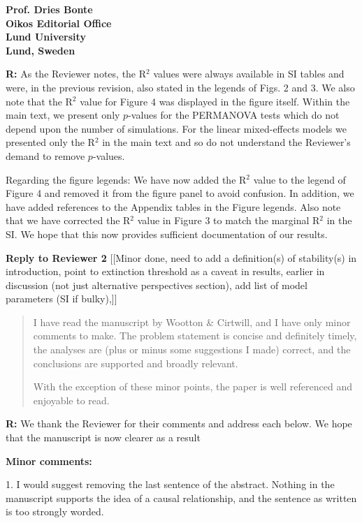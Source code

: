 \documentclass[12pt]{letter}
\begin{document}
\begin{letter}{\bf Prof. Dries Bonte\\
Oikos Editorial Office \\
Lund University \\
Lund, Sweden}
      \smallskip

      \textbf{R:} As the Reviewer notes, the R$^2$ values were always available in SI tables and were, in the previous revision, also stated in the legends of Figs. 2 and 3. We also note that the R$^2$ value for Figure 4 was displayed in the figure itself. Within the main text, we present only $p$-values for the PERMANOVA tests which do not depend upon the number of simulations. For the linear mixed-effects models we presented only the R$^2$ in the main text and so do not understand the Reviewer's demand to remove $p$-values.


      Regarding the figure legends: We have now added the R$^2$ value to the legend of Figure 4 and removed it from the figure panel to avoid confusion. In addition, we have added references to the Appendix tables in the Figure legends. Also note that we have corrected the R$^2$ value in Figure 3 to match the marginal R$^2$ in the SI. We hope that this now provides sufficient documentation of our results.



\clearpage

{\large\textbf{Reply to Reviewer 2}} [[Minor done, need to add a definition(s) of stability(s) in introduction, point to extinction threshold as a caveat in results, earlier in discussion (not just alternative perspectives section), add list of model parameters (SI if bulky),]]

  \begin{quotation}
    I have read the manuscript by Wootton \& Cirtwill, and I have only minor comments to make. The problem statement is concise and definitely timely, the analyses are (plus or minus some suggestions I made) correct, and the conclusions are supported and broadly relevant.

    With the exception of these minor points, the paper is well referenced and enjoyable to read.
  \end{quotation}  

  \smallskip

  \textbf{R:} We thank the Reviewer for their comments and address each below. We hope that the manuscript is now clearer as a result

  \smallskip

  \textbf{Minor comments:}

    1. I would suggest removing the last sentence of the abstract. Nothing in the manuscript supports the idea of a causal relationship, and the sentence as written is too strongly worded.


\end{letter}
\end{document}
